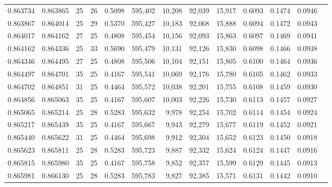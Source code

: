 \begin{tabular}{rrrrrrrrrrrrr}
0.863734 & 0.863865 &    25 &  26 &                                     0.5098 & 595,402 &  10,208 &  92,039 &  15,917 & 0.6093 & 0.1474 & 0.0946 \\
0.863867 & 0.864014 &    25 &  29 &                                     0.5370 & 595,427 &  10,183 &  92,068 &  15,888 & 0.6094 & 0.1472 & 0.0943 \\
0.864017 & 0.864162 &    27 &  25 &                                     0.4808 & 595,454 &  10,156 &  92,093 &  15,863 & 0.6097 & 0.1469 & 0.0941 \\
0.864162 & 0.864336 &    25 &  33 &                                     0.5690 & 595,479 &  10,131 &  92,126 &  15,830 & 0.6098 & 0.1466 & 0.0938 \\
0.864346 & 0.864495 &    27 &  25 &                                     0.4808 & 595,506 &  10,104 &  92,151 &  15,805 & 0.6100 & 0.1464 & 0.0936 \\
0.864497 & 0.864701 &    35 &  25 &                                     0.4167 & 595,541 &  10,069 &  92,176 &  15,780 & 0.6105 & 0.1462 & 0.0933 \\
0.864702 & 0.864851 &    31 &  25 &                                     0.4464 & 595,572 &  10,038 &  92,201 &  15,755 & 0.6108 & 0.1459 & 0.0930 \\
0.864856 & 0.865063 &    35 &  25 &                                     0.4167 & 595,607 &  10,003 &  92,226 &  15,730 & 0.6113 & 0.1457 & 0.0927 \\
0.865065 & 0.865214 &    25 &  28 &                                     0.5283 & 595,632 &   9,978 &  92,254 &  15,702 & 0.6114 & 0.1454 & 0.0924 \\
0.865217 & 0.865439 &    35 &  25 &                                     0.4167 & 595,667 &   9,943 &  92,279 &  15,677 & 0.6119 & 0.1452 & 0.0921 \\
0.865440 & 0.865622 &    31 &  25 &                                     0.4464 & 595,698 &   9,912 &  92,304 &  15,652 & 0.6123 & 0.1450 & 0.0918 \\
0.865623 & 0.865811 &    25 &  28 &                                     0.5283 & 595,723 &   9,887 &  92,332 &  15,624 & 0.6124 & 0.1447 & 0.0916 \\
0.865815 & 0.865980 &    35 &  25 &                                     0.4167 & 595,758 &   9,852 &  92,357 &  15,599 & 0.6129 & 0.1445 & 0.0913 \\
0.865981 & 0.866130 &    25 &  28 &                                     0.5283 & 595,783 &   9,827 &  92,385 &  15,571 & 0.6131 & 0.1442 & 0.0910 \\

\end{tabular}
